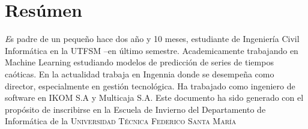 
\section*{\textbf{Res\'umen}}
	\begin{scriptsize}
	\textsl
	Es padre de un peque\~no hace dos a\~no y 10 meses, estudiante de Ingenier\'ia Civil 
	Inform\'atica en la UTFSM --en \'ultimo semestre. 
	Academicamente trabajando en Machine Learning estudiando modelos de
    predicción de series de tiempos caóticas.
    En la actualidad trabaja en Ingennia donde se desempeña como director,
    especialmente en gestión tecnológica.
    Ha trabajado como ingeniero de software en IKOM S.A y Multicaja S.A.
    Este documento ha sido generado con el propósito de inscribirse en la
    Escuela de Invierno del Departamento de Informática de la
    \textsc{Universidad Técnica Federico Santa María}
    \end{scriptsize}
    \newline
